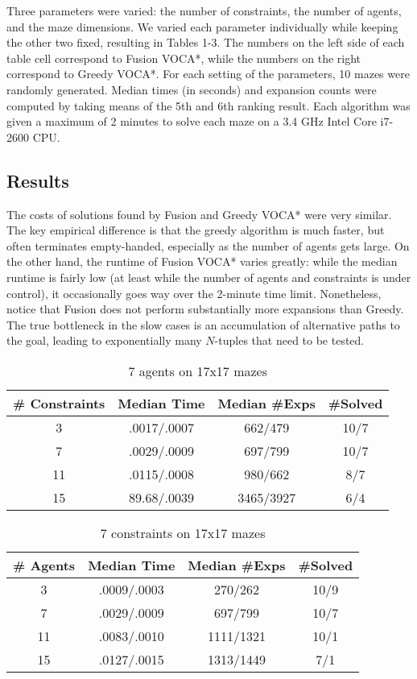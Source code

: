 \documentclass[letterpaper]{article}
\begin{document}
Three parameters were varied: the number of constraints, the number of agents, and the maze dimensions. We varied each parameter individually while keeping the other two fixed, resulting in Tables 1-3. The numbers on the left side of each table cell correspond to Fusion VOCA*, while the numbers on the right correspond to Greedy VOCA*. For each setting of the parameters, 10 mazes were randomly generated. Median times (in seconds) and expansion counts were computed by taking means of the 5th and 6th ranking result. Each algorithm was given a maximum of 2 minutes to solve each maze on a 3.4 GHz Intel Core i7-2600 CPU.

\subsection{Results}

The costs of solutions found by Fusion and Greedy VOCA* were very similar. The key empirical difference is that the greedy algorithm is much faster, but often terminates empty-handed, especially as the number of agents gets large. On the other hand, the runtime of Fusion VOCA* varies greatly: while the median runtime is fairly low (at least while the number of agents and constraints is under control), it occasionally goes way over the 2-minute time limit. Nonetheless, notice that Fusion does not perform substantially more expansions than Greedy. The true bottleneck in the slow cases is an accumulation of alternative paths to the goal, leading to exponentially many $N$-tuples that need to be tested.

\begin{table}
\centering
\begin{tabular} {|c|c|c|c|} \hline
\# Constraints & Median Time & Median \#Exps & \#Solved \\ \hline
3 & .0017/.0007 & 662/479 & 10/7 \\ \hline
7 & .0029/.0009 & 697/799 & 10/7 \\ \hline
11 & .0115/.0008 & 980/662 & 8/7 \\ \hline
15 & 89.68/.0039 & 3465/3927 & 6/4 \\ \hline
\end{tabular}
\caption{7 agents on 17x17 mazes}
\label{tab:doors}
\end{table}

\begin{table}
\centering
\begin{tabular} {|c|c|c|c|} \hline
\# Agents & Median Time & Median \#Exps & \#Solved \\ \hline
3 & .0009/.0003 & 270/262 & 10/9 \\ \hline
7 & .0029/.0009 & 697/799 & 10/7 \\ \hline
11 & .0083/.0010 & 1111/1321 & 10/1 \\ \hline
15 & .0127/.0015 & 1313/1449 & 7/1 \\ \hline
\end{tabular}
\caption{7 constraints on 17x17 mazes}
\label{tab:agents}
\end{table}
\end{document}
